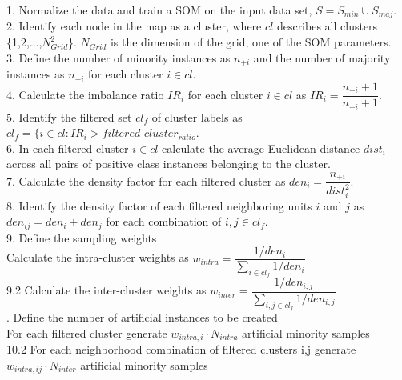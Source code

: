 \documentclass[parskip=full]{scrartcl}
\begin{document}
\begin{algorithm}[H]
	1. Normalize the data and train a SOM on the input data set, $S = S_{min} \cup S_{maj}$. \\
	2. Identify each node in the map as a cluster, where $cl$ describes all clusters \{1,2,...,$N_{Grid}^2$\}. $N_{Grid}$ is the dimension of the grid, one of the SOM parameters. \\
	3. Define the number of minority instances as $n_{+i}$ and the number of majority instances as $n_{-i}$ for each cluster $i \in cl$. \\
	4. Calculate the imbalance ratio $IR_{i}$ for each cluster $i \in cl$ as $IR_{i} = \dfrac{n_{+i} +1}{n_{-i} +1}$.\\
	5. Identify the filtered set $cl_{f}$ of cluster labels as $cl_{f} = \{i \in cl: IR_{i} > filtered\_cluster_{ratio}$. \\
	6. In each filtered cluster $i \in cl$ calculate the average Euclidean distance $dist_{i}$ across all pairs of positive class instances belonging to the cluster. \\ 
	7. Calculate the density factor for each filtered cluster as $den_{i} = \dfrac{n_{+i}}{dist_{i}^2}$. \\
	8. Identify the density factor of each filtered neighboring units $i$ and $j$ as $den_{ij} = den_{i} + den_{j}$ for each combination of $i, j \in cl_{f}$. \\
	9. Define the sampling weights\\
	 Calculate the intra-cluster weights as $w_{intra} = \dfrac{1 / den_{i}}{\sum_{i \in cl_{f}} 1/den_{i}}$ \\
		9.2 Calculate the inter-cluster weights as $w_{inter} = \dfrac{1 / den_{i,j}}{\sum_{i,j \in cl_{f}} 1/den_{i,j}}$ \\
	. Define the number of artificial instances to be created \\
	 For each filtered cluster generate $w_{intra, i} \cdot N_{intra}$ artificial minority samples \\
		10.2 For each neighborhood combination of filtered clusters i,j generate $w_{intra, ij} \cdot N_{inter}$ artificial minority samples\\
	\Indm
	

\end{algorithm}
\end{document}
